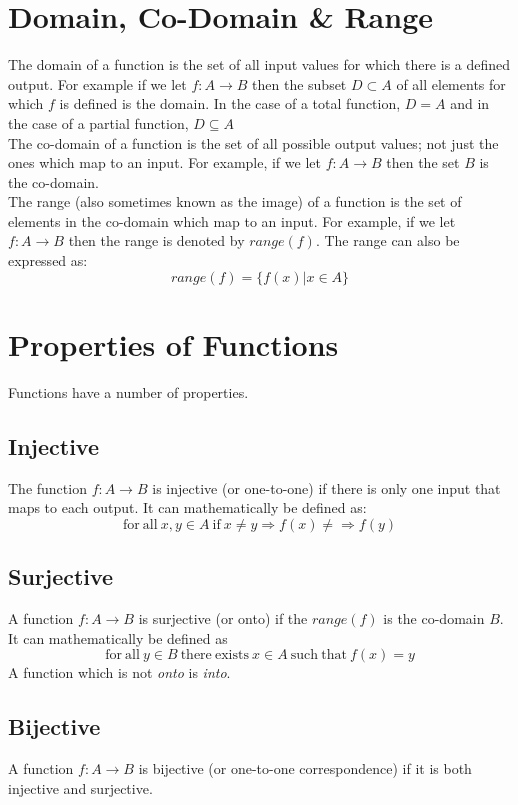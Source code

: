 \section{Domain, Co-Domain \& Range}
The domain of a function is the set of all input values for which there is a defined output. For example if we let $f: A \rightarrow B$ then the subset $D \subset A$ of all elements for which $f$ is defined is the domain. In the case of a total function, $D = A$ and in the case of a partial function, $ D \subseteq A$\\

The co-domain of a function is the set of all possible output values; not just the ones which map to an input. For example, if we let $f: A \rightarrow B$ then the set $B$ is the co-domain. \\

The range (also sometimes known as the image) of a function is the set of elements in the co-domain which map to an input. For example, if we let $f: A \rightarrow B$ then the range is denoted by $range(f)$. The range can also be expressed as:
\[range(f) = \{f (x) | x \in A\}\]

\section{Properties of Functions}
Functions have a number of properties. 
\subsection{Injective}
The function $f: A \rightarrow B$ is injective (or one-to-one) if there is only one input that maps to each output. It can mathematically be defined as:
\[\mathrm{for\ all\ } x,y \in A \mathrm{\ if \ } x \neq y \Rightarrow f(x) \neq \Rightarrow f(y)\]

\subsection{Surjective}
A function $f: A \rightarrow B$ is surjective (or onto) if the $range(f)$ is the co-domain $B$. It can mathematically be defined as
\[\mathrm{for\ all\ } y \in B \mathrm{\ there\ exists\ } x \in A \mathrm{\ such\ that\ } f(x) = y \]
A function which is not \textit{onto} is \textit{into}.

\subsection{Bijective}
A function $f: A \rightarrow B$ is bijective (or one-to-one correspondence) if it is both injective and surjective.

